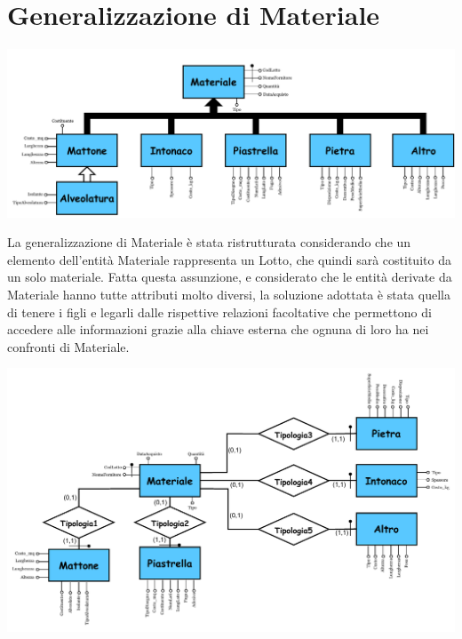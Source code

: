 \documentclass[12pt,a4paper]{report}
\begin{document}
            \section{Generalizzazione di Materiale}
            \label{ref2}
                \begin{center}
                    \includegraphics[scale=0.8]{genMateriale.pdf}
                \end{center}
                \vspace*{0.8cm}
                La generalizzazione di Materiale è stata ristrutturata considerando che un elemento dell'entità Materiale rappresenta un Lotto, che quindi sarà costituito da un solo materiale. Fatta questa assunzione, e considerato che le entità derivate da Materiale hanno tutte attributi molto diversi, la soluzione adottata è stata quella di tenere i figli e legarli dalle rispettive relazioni facoltative che permettono di accedere alle informazioni grazie alla chiave esterna che ognuna di loro ha nei confronti di Materiale.

                \vspace*{0.8cm}
                \begin{center}
                    \includegraphics[scale=0.8]{genMaterialeTrad.pdf}
                \end{center}
                \vspace*{0.8cm}
                
\end{document}

